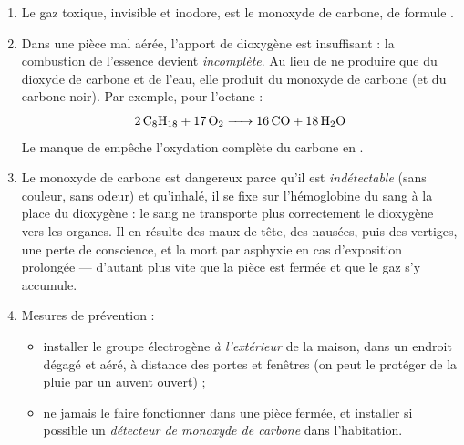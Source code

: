 \documentclass[11pt]{article}
\newcommand{\cle}[1]{{\popxbold\color{popdark}#1}}
\begin{document}
\begin{corrige}
\begin{enumerate}
\item Le gaz toxique, invisible et inodore, est le \cle{monoxyde de carbone}, de formule .
\item Dans une pièce mal aérée, l'apport de dioxygène  est insuffisant : la combustion de l'essence devient \emph{incomplète}. Au lieu de ne produire que du dioxyde de carbone et de l'eau, elle produit du monoxyde de carbone (et du carbone noir). Par exemple, pour l'octane :
\[ \ce{2C8H18 + 17O2 -> 16CO + 18H2O} \]
Le manque de  empêche l'oxydation complète du carbone en .
\item Le monoxyde de carbone est dangereux parce qu'il est \emph{indétectable} (sans couleur, sans odeur) et qu'inhalé, il se fixe sur l'hémoglobine du sang à la place du dioxygène : le sang ne transporte plus correctement le dioxygène vers les organes. Il en résulte des maux de tête, des nausées, puis des vertiges, une perte de conscience, et la mort par asphyxie en cas d'exposition prolongée — d'autant plus vite que la pièce est fermée et que le gaz s'y accumule.
\item Mesures de prévention :
\begin{itemize}
\item installer le groupe électrogène \emph{à l'extérieur} de la maison, dans un endroit dégagé et aéré, à distance des portes et fenêtres (on peut le protéger de la pluie par un auvent ouvert) ;
\item ne jamais le faire fonctionner dans une pièce fermée, et installer si possible un \emph{détecteur de monoxyde de carbone} dans l'habitation.
\end{itemize}
\end{enumerate}
\end{corrige}
\end{document}
